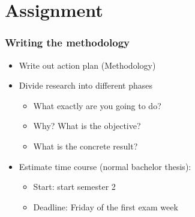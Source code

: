 \documentclass[aspectratio=169]{beamer}
\begin{document}
\section{Assignment}

\begin{frame}
  \frametitle{Writing the methodology}

  \begin{itemize}
      \item Write out action plan (Methodology)
      \item Divide research into different phases
      \begin{itemize}
          \item What exactly are you going to do?
          \item Why? What is the objective?
          \item What is the concrete result?
      \end{itemize}
      \item Estimate time course (normal bachelor thesis):
      \begin{itemize}
          \item Start: start semester 2
          \item Deadline: Friday of the first exam week
      \end{itemize}
  \end{itemize}

\end{frame}
\end{document}
